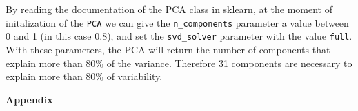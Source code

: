 \documentclass[12pt]{article}
\begin{document}
\begin{enumerate}[leftmargin=\labelsep]
          By reading the documentation of the \href{https://scikit-learn.org/stable/modules/generated/sklearn.decomposition.PCA.html}{PCA class} in sklearn,
          at the moment of initalization of the \texttt{PCA} we can give the \texttt{n\_components} parameter a value between 0 and 1 (in this case 0.8),
          and set the \texttt{svd\_solver} parameter with the value \texttt{full}.
          With these parameters, the PCA will return the number of components that explain more than 80\% of the variance.
          Therefore 31 components are necessary to explain more than 80\% of variability.

\end{enumerate}

\pagebreak

\center\large{\textbf{Appendix}\vskip 0.3cm}



\vspace*{1.5cm}



\vspace*{1.5cm}


\end{document}
